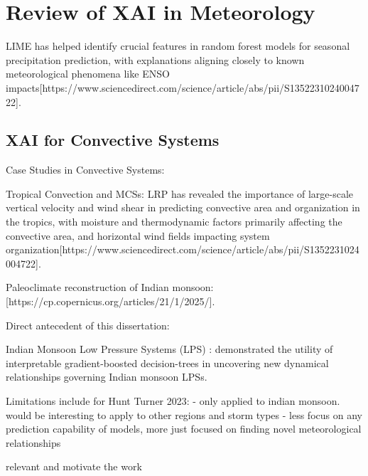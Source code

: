 
\section{Review of XAI in Meteorology}

LIME has helped identify crucial features in random forest models for seasonal precipitation prediction, with explanations aligning closely to known meteorological phenomena like ENSO impacts[https://www.sciencedirect.com/science/article/abs/pii/S1352231024004722].


\subsection{XAI for Convective Systems}

Case Studies in Convective Systems:

Tropical Convection and MCSs: LRP has revealed the importance of large-scale vertical velocity and wind shear in predicting convective area and organization in the tropics, with moisture and thermodynamic factors primarily affecting the convective area, and horizontal wind fields impacting system organization[https://www.sciencedirect.com/science/article/abs/pii/S1352231024004722].

Paleoclimate reconstruction of Indian monsoon: [https://cp.copernicus.org/articles/21/1/2025/].

Direct antecedent of this dissertation: 

Indian Monsoon Low Pressure Systems (LPS) : \cite{Hunt2024} demonstrated the utility of interpretable gradient-boosted decision-trees in uncovering new dynamical relationships governing Indian monsoon LPSs.

Limitations include for Hunt Turner 2023: 
- only applied to indian monsoon. would be interesting to apply to other regions and storm types
- less focus on any prediction capability of models, more just focused on finding novel meteorological relationships

relevant and motivate the work